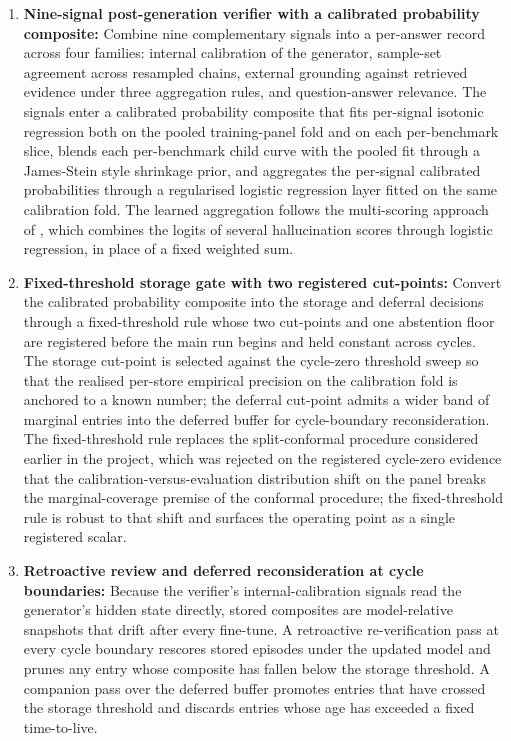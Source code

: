 \begin{enumerate}
\item \textbf{Nine-signal post-generation verifier with a calibrated probability composite:} Combine nine complementary signals into a per-answer record across four families: internal calibration of the generator, sample-set agreement across resampled chains, external grounding against retrieved evidence under three aggregation rules, and question-answer relevance. The signals enter a calibrated probability composite that fits per-signal isotonic regression both on the pooled training-panel fold and on each per-benchmark slice, blends each per-benchmark child curve with the pooled fit through a James-Stein style shrinkage prior, and aggregates the per-signal calibrated probabilities through a regularised logistic regression layer fitted on the same calibration fold. The learned aggregation follows the multi-scoring approach of \cite{valentin2024hallucination}, which combines the logits of several hallucination scores through logistic regression, in place of a fixed weighted sum.

\item \textbf{Fixed-threshold storage gate with two registered cut-points:} Convert the calibrated probability composite into the storage and deferral decisions through a fixed-threshold rule whose two cut-points and one abstention floor are registered before the main run begins and held constant across cycles. The storage cut-point is selected against the cycle-zero threshold sweep so that the realised per-store empirical precision on the calibration fold is anchored to a known number; the deferral cut-point admits a wider band of marginal entries into the deferred buffer for cycle-boundary reconsideration. The fixed-threshold rule replaces the split-conformal procedure considered earlier in the project, which was rejected on the registered cycle-zero evidence that the calibration-versus-evaluation distribution shift on the panel breaks the marginal-coverage premise of the conformal procedure; the fixed-threshold rule is robust to that shift and surfaces the operating point as a single registered scalar.

\item \textbf{Retroactive review and deferred reconsideration at cycle boundaries:} Because the verifier's internal-calibration signals read the generator's hidden state directly, stored composites are model-relative snapshots that drift after every fine-tune. A retroactive re-verification pass at every cycle boundary rescores stored episodes under the updated model and prunes any entry whose composite has fallen below the storage threshold. A companion pass over the deferred buffer promotes entries that have crossed the storage threshold and discards entries whose age has exceeded a fixed time-to-live.


\end{enumerate}
